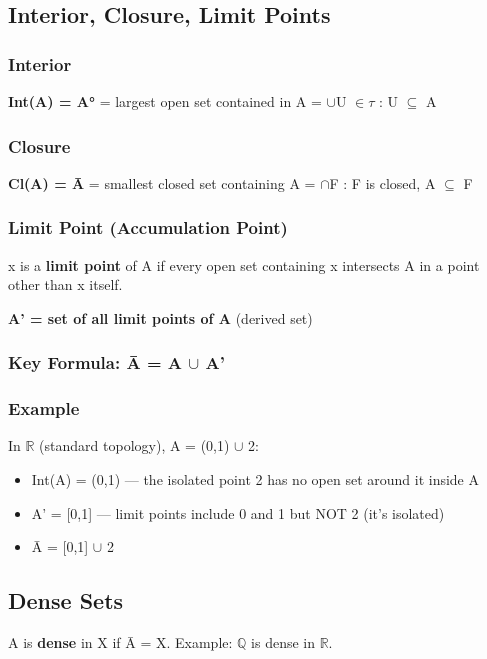 \documentclass[12pt,a4paper,openany]{book}
\begin{document}
{{\subsection{Interior, Closure, Limit Points}

\subsubsection{Interior}
\textbf{Int(A) = A°} = largest open set contained in A = $\cup${U $\in\tau$ : U $\subseteq$ A}

\subsubsection{Closure}
\textbf{Cl(A) = Ā} = smallest closed set containing A = $\cap${F : F is closed, A $\subseteq$ F}

\subsubsection{Limit Point (Accumulation Point)}
x is a \textbf{limit point} of A if every open set containing x intersects A in a point other than x itself.

\textbf{A' = set of all limit points of A} (derived set)

\subsubsection{Key Formula: \textbf{Ā = A $\cup$ A'}}

\subsubsection{Example}
In $\mathbb{R}$ (standard topology), A = (0,1) $\cup$ {2}:
\begin{itemize}[leftmargin=*]
  \item Int(A) = (0,1) — the isolated point 2 has no open set around it inside A
  \item A' = [0,1] — limit points include 0 and 1 but NOT 2 (it's isolated)
  \item Ā = [0,1] $\cup$ {2}
\end{itemize}

\subsection{Dense Sets}
A is \textbf{dense} in X if Ā = X. Example: $\mathbb{Q}$ is dense in $\mathbb{R}$.

}}
\end{document}
